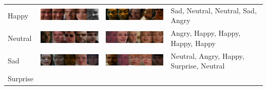 \documentclass[10pt,twocolumn,letterpaper]{article}
\begin{document}
\begin{table}[!ht]
\begin{tabular}{m{2cm}m{5cm}m{5cm}m{4cm}}
		     Happy& \begin{minipage}{.3\textwidth}
		   \includegraphics[width=5cm]{res/3_best.pdf} 
		   \end{minipage}
		   & \begin{minipage}{.3\textwidth}
		   \includegraphics[width=5cm]{res/3_worst.pdf}
		    \end{minipage} & Sad, Neutral, Neutral, Sad, Angry\\
		     Neutral& \begin{minipage}{.3\textwidth}
		   \includegraphics[width=5cm]{res/4_best.pdf} 
		   \end{minipage}
		   & \begin{minipage}{.3\textwidth}
		   \includegraphics[width=5cm]{res/4_worst.pdf}
		    \end{minipage} & Angry, Happy, Happy, Happy, Happy\\
		     Sad& \begin{minipage}{.3\textwidth}
		   \includegraphics[width=5cm]{res/5_best.pdf} 
		   \end{minipage}
		   & \begin{minipage}{.3\textwidth}
		   \includegraphics[width=5cm]{res/5_worst.pdf}
		    \end{minipage} & Neutral, Angry, Happy, Surprise, Neutral\\
		     Surprise& \begin{minipage}{.3\textwidth}

\end{minipage}
\end{tabular}
\end{table}
\end{document}
